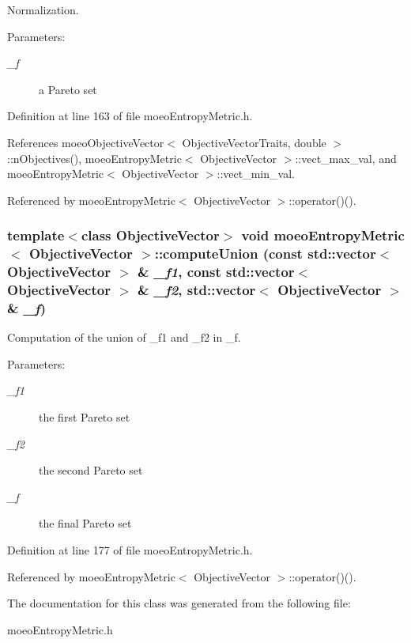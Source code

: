 Normalization. 

\begin{Desc}
\item[Parameters:]
\begin{description}
\item[{\em \_\-f}]a Pareto set \end{description}
\end{Desc}


Definition at line 163 of file moeo\-Entropy\-Metric.h.

References moeo\-Objective\-Vector$<$ Objective\-Vector\-Traits, double $>$::n\-Objectives(), moeo\-Entropy\-Metric$<$ Objective\-Vector $>$::vect\_\-max\_\-val, and moeo\-Entropy\-Metric$<$ Objective\-Vector $>$::vect\_\-min\_\-val.

Referenced by moeo\-Entropy\-Metric$<$ Objective\-Vector $>$::operator()().
\subsubsection{\setlength{\rightskip}{0pt plus 5cm}template$<$class Objective\-Vector$>$ void \bf{moeo\-Entropy\-Metric}$<$ \bf{Objective\-Vector} $>$::compute\-Union (const std::vector$<$ \bf{Objective\-Vector} $>$ \& {\em \_\-f1}, const std::vector$<$ \bf{Objective\-Vector} $>$ \& {\em \_\-f2}, std::vector$<$ \bf{Objective\-Vector} $>$ \& {\em \_\-f})\hspace{0.3cm}{\tt  [inline, private]}}\label{classmoeoEntropyMetric_4b99c1842d780a89bda08e99a59e3e29}


Computation of the union of \_\-f1 and \_\-f2 in \_\-f. 

\begin{Desc}
\item[Parameters:]
\begin{description}
\item[{\em \_\-f1}]the first Pareto set \item[{\em \_\-f2}]the second Pareto set \item[{\em \_\-f}]the final Pareto set \end{description}
\end{Desc}


Definition at line 177 of file moeo\-Entropy\-Metric.h.

Referenced by moeo\-Entropy\-Metric$<$ Objective\-Vector $>$::operator()().

The documentation for this class was generated from the following file:\begin{CompactItemize}
\item 
moeo\-Entropy\-Metric.h\end{CompactItemize}
